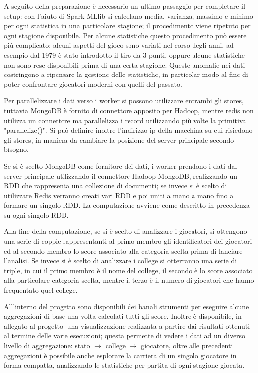 \documentclass[10pt,a4paper,twocolumn]{article}
\begin{document}
A seguito della preparazione è necessario un ultimo passaggio per completare il setup: con l'aiuto di Spark MLlib si calcolano media, varianza, massimo e minimo per ogni statistica in una particolare stagione; il procedimento viene ripetuto per ogni stagione disponibile. Per alcune statistiche questo procedimento può essere più complicato: alcuni aspetti del gioco sono variati nel corso degli anni, ad esempio dal 1979 è stato introdotto il tiro da 3 punti, oppure alcune statistiche non sono rese disponibili prima di una certa stagione. Queste anomalie nei dati costringono a ripensare la gestione delle statistiche, in particolar modo al fine di poter confrontare giocatori moderni con quelli del passato.

Per parallelizzare i dati verso i worker si possono utilizzare entrambi gli stores, tuttavia MongoDB è fornito di connettore apposito per Hadoop, mentre redis non utilizza un connettore ma parallelizza i record utilizzando più volte la primitiva "parallelize()". Si può definire inoltre l'indirizzo ip della macchina su cui risiedono gli stores, in maniera da cambiare la posizione del server principale secondo bisogno.

Se si è scelto MongoDB come fornitore dei dati, i worker prendono i dati dal server principale utilizzando il connettore Hadoop-MongoDB, realizzando un RDD che rappresenta una collezione di documenti;  se invece si è scelto di utilizzare Redis verranno creati vari RDD e poi uniti a mano a mano fino a formare un singolo RDD. La computazione avviene come descritto in precedenza su ogni singolo RDD.

Alla fine della computazione, se si è scelto di analizzare i giocatori, si ottengono una serie di coppie rappresentanti al primo membro gli identificatori dei giocatori ed al secondo membro lo score associato alla categoria scelta prima di lanciare l'analisi. Se invece si è scelto di analizzare i college si otterranno una serie di triple, in cui il primo membro è il nome del college, il secondo è lo score associato alla particolare categoria scelta, mentre il terzo è il numero di giocatori che hanno frequentato quel college.

All'interno del progetto sono disponibili dei banali strumenti per eseguire alcune aggregazioni di base una volta calcolati tutti gli score. Inoltre è disponibile, in allegato al progetto, una visualizzazione realizzata a partire dai risultati ottenuti al termine delle varie esecuzioni; questa permette di vedere i dati ad un diverso livello di aggregazione: stato $\rightarrow$ college $\rightarrow$ giocatore, oltre alle precedenti aggregazioni è possibile anche esplorare la carriera di un singolo giocatore in forma compatta, analizzando le statistiche per partita di ogni stagione giocata.
\end{document}

